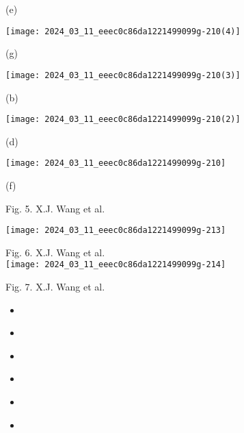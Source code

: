 \documentclass[10pt]{article}
\begin{document}
(e)

\begin{center}
\texttt{[image: 2024\_03\_11\_eeec0c86da1221499099g-210(4)]}
\end{center}

(g)

\begin{center}
\texttt{[image: 2024\_03\_11\_eeec0c86da1221499099g-210(3)]}
\end{center}

(b)

\begin{center}
\texttt{[image: 2024\_03\_11\_eeec0c86da1221499099g-210(2)]}
\end{center}

(d)

\begin{center}
\texttt{[image: 2024\_03\_11\_eeec0c86da1221499099g-210]}
\end{center}

(f)

Fig. 5. X.J. Wang et al.

\begin{center}
\texttt{[image: 2024\_03\_11\_eeec0c86da1221499099g-213]}
\end{center}

Fig. 6. X.J. Wang et al.\\
\texttt{[image: 2024\_03\_11\_eeec0c86da1221499099g-214]}

Fig. 7. X.J. Wang et al.

\begin{itemize}
  \item 
\end{itemize}

\begin{itemize}
  \item 
\end{itemize}

\begin{itemize}
  \item 
\end{itemize}

\begin{itemize}
  \item 
\end{itemize}

\begin{itemize}
  \item 
\end{itemize}

\begin{itemize}
  \item 
\end{itemize}
\end{document}
